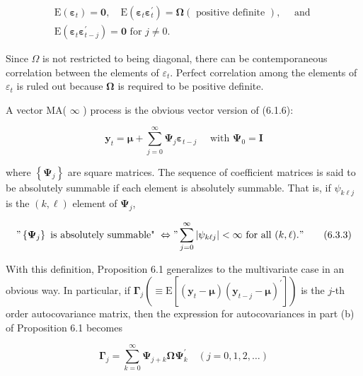 \documentclass[10pt]{article}
\begin{document}
\begin{gather*}
\mathrm{E}\left(\boldsymbol{\varepsilon}_{t}\right)=\mathbf{0}, \quad \mathrm{E}\left(\boldsymbol{\varepsilon}_{t} \boldsymbol{\varepsilon}_{t}^{\prime}\right)=\boldsymbol{\Omega}(\text { positive definite }), \quad \text { and } \\
\mathrm{E}\left(\boldsymbol{\varepsilon}_{t} \boldsymbol{\varepsilon}_{t-j}^{\prime}\right)=\mathbf{0} \text { for } j \neq 0 . \tag{6.3.1}
\end{gather*}


Since $\Omega$ is not restricted to being diagonal, there can be contemporaneous correlation between the elements of $\varepsilon_{t}$. Perfect correlation among the elements of $\varepsilon_{t}$ is ruled out because $\boldsymbol{\Omega}$ is required to be positive definite.

A vector MA( $\boldsymbol{\infty}$ ) process is the obvious vector version of (6.1.6):


\begin{equation*}
\mathbf{y}_{t}=\boldsymbol{\mu}+\sum_{j=0}^{\infty} \boldsymbol{\Psi}_{j} \boldsymbol{\varepsilon}_{t-j} \quad \text { with } \boldsymbol{\Psi}_{0}=\mathbf{I} \tag{6.3.2}
\end{equation*}


where $\left\{\boldsymbol{\Psi}_{j}\right\}$ are square matrices. The sequence of coefficient matrices is said to be absolutely summable if each element is absolutely summable. That is, if $\psi_{k \ell j}$ is the $(k, \ell)$ element of $\boldsymbol{\Psi}_{j}$,


\begin{equation*}
"\left\{\boldsymbol{\Psi}_{j}\right\} \text { is absolutely summable" } \Leftrightarrow " \sum_{j=0}^{\infty}\left|\psi_{k \ell j}\right|<\infty \text { for all }(k, \ell) . " \tag{6.3.3}
\end{equation*}


With this definition, Proposition 6.1 generalizes to the multivariate case in an obvious way. In particular, if $\boldsymbol{\Gamma}_{j}\left(\equiv \mathrm{E}\left[\left(\mathbf{y}_{t}-\boldsymbol{\mu}\right)\left(\mathbf{y}_{t-j}-\boldsymbol{\mu}\right)^{\prime}\right]\right)$ is the $j$-th order autocovariance matrix, then the expression for autocovariances in part (b) of Proposition 6.1 becomes


\begin{equation*}
\boldsymbol{\Gamma}_{j}=\sum_{k=0}^{\infty} \boldsymbol{\Psi}_{j+k} \boldsymbol{\Omega} \boldsymbol{\Psi}_{k}^{\prime} \quad(j=0,1,2, \ldots) \tag{6.3.4}
\end{equation*}
\end{document}
